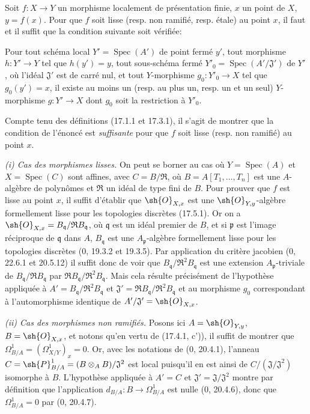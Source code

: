 \begin{proposition}[17.14.1]
\label{IV.17.14.1}
Soit $f:X\to Y$ un morphisme localement de présentation finie, $x$ un point de $X$, $y=f(x)$. Pour que $f$ soit lisse (resp. non ramifié, resp. étale) au point $x$, il faut et il suffit que la condition suivante soit vérifiée:

Pour tout schéma local $Y'=\operatorname{Spec}(A')$ de point fermé $y'$, tout morphisme $h:Y'\to Y$ tel que $h(y')=y$, tout sous-schéma fermé $Y'_0=\operatorname{Spec}(A'/\mathfrak{J}')$ de $Y'$, où l'idéal $\mathfrak{J}'$ est de carré nul, et tout $Y$-morphisme $g_0:Y'_0\to X$ tel que $g_0(y')=x$, il existe au moins un (resp. au plus un, resp. un et un seul) $Y$-morphisme $g:Y'\to X$ dont $g_0$ soit la restriction à $Y'_0$.
\end{proposition}

Compte tenu des définitions (17.1.1 et 17.3.1), il s'agit de montrer que la condition de l'énoncé est \emph{suffisante} pour que $f$ soit lisse (resp. non ramifié) au point $x$.

\emph{(i) Cas des morphismes lisses.} On peut se borner au cas où $Y=\operatorname{Spec}(A)$ et $X=\operatorname{Spec}(C)$ sont affines, avec $C=B/\mathfrak{R}$, où $B=A[T_1,\ldots,T_n]$ est une $A$-algèbre de polynômes et $\mathfrak{R}$ un idéal de type fini de $B$. Pour prouver que $f$ est lisse au point $x$, il suffit d'établir que $\sh{O}_{X,x}$ est une $\sh{O}_{Y,y}$-algèbre formellement lisse pour les topologies discrètes (17.5.1). Or on a $\sh{O}_{X,x}=B_{\mathfrak q}/\mathfrak{R}B_{\mathfrak q}$, où $\mathfrak q$ est un idéal premier de $B$, et si $\mathfrak p$ est l'image réciproque de $\mathfrak q$ dans $A$, $B_{\mathfrak q}$ est une $A_{\mathfrak p}$-algèbre formellement lisse pour les topologies discrètes (0, 19.3.2 et 19.3.5). Par application du critère jacobien (0, 22.6.1 et 20.5.12) il suffit donc de voir que $B_{\mathfrak q}/\mathfrak{R}^2B_{\mathfrak q}$ est une extension $A_{\mathfrak p}$-triviale de $B_{\mathfrak q}/\mathfrak{R}B_{\mathfrak q}$ par $\mathfrak{R}B_{\mathfrak q}/\mathfrak{R}^2B_{\mathfrak q}$. Mais cela résulte précisément de l'hypothèse appliquée à $A'=B_{\mathfrak q}/\mathfrak{R}^2B_{\mathfrak q}$ et $\mathfrak{J}'=\mathfrak{R}B_{\mathfrak q}/\mathfrak{R}^2B_{\mathfrak q}$ et au morphisme $g_0$ correspondant à l'automorphisme identique de $A'/\mathfrak{J}'=\sh{O}_{X,x}$.

\emph{(ii) Cas des morphismes non ramifiés.} Posons ici $A=\sh{O}_{Y,y}$, $B=\sh{O}_{X,x}$, et notons qu'en vertu de (17.4.1, c')), il suffit de montrer que $\Omega^1_{B/A}=(\Omega^1_{X/Y})_x=0$. Or, avec les notations de (0, 20.4.1), l'anneau $C=\sh{P}^1_{B/A}=(B\otimes_A B)/\mathfrak{J}^2$ est local puisqu'il en est ainsi de $C/(\mathfrak{J}/\mathfrak{J}^2)$ isomorphe à $B$. L'hypothèse appliquée à $A'=C$ et $\mathfrak{J}'=\mathfrak{J}/\mathfrak{J}^2$ montre par définition que l'application $d_{B/A}:B\to\Omega^1_{B/A}$ est nulle (0, 20.4.6), donc que $\Omega^1_{B/A}=0$ par (0, 20.4.7).

